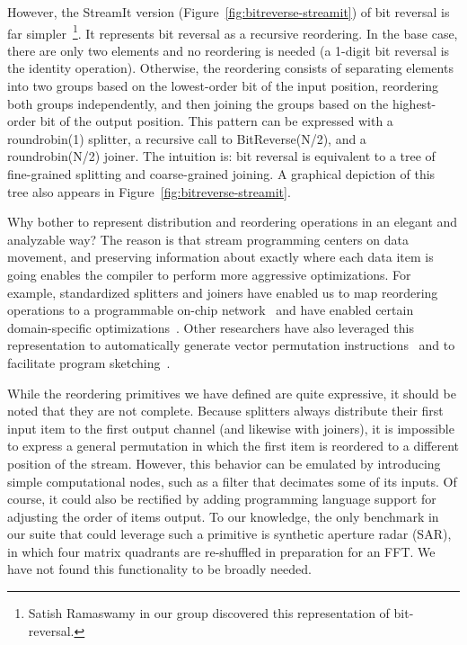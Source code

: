 However, the StreamIt version (Figure~\ref{fig:bitreverse-streamit})
of bit reversal is far simpler~\footnote{Satish Ramaswamy in our group
  discovered this representation of bit-reversal.}.  It represents bit
reversal as a recursive reordering.  In the base case, there are only
two elements and no reordering is needed (a 1-digit bit reversal is
the identity operation).  Otherwise, the reordering consists of
separating elements into two groups based on the lowest-order bit of
the input position, reordering both groups independently, and then
joining the groups based on the highest-order bit of the output
position.  This pattern can be expressed with a roundrobin(1)
splitter, a recursive call to BitReverse(N/2), and a roundrobin(N/2)
joiner.  The intuition is: bit reversal is equivalent to a tree of
fine-grained splitting and coarse-grained joining.  A graphical
depiction of this tree also appears in
Figure~\ref{fig:bitreverse-streamit}.

Why bother to represent distribution and reordering operations in an
elegant and analyzable way?  The reason is that stream programming
centers on data movement, and preserving information about exactly
where each data item is going enables the compiler to perform more
aggressive optimizations.  For example, standardized splitters and
joiners have enabled us to map reordering operations to a programmable
on-chip network~\cite{gordon-asplos02} and have enabled certain
domain-specific
optimizations~\cite{lamb-pldi03,agrawal-cases05,techreport}.
Other researchers have also leveraged this representation to
automatically generate vector permutation
instructions~\cite{mani-permutations} and to facilitate program
sketching~\cite{bit-streaming}.

While the reordering primitives we have defined are quite expressive,
it should be noted that they are not complete.  Because splitters
always distribute their first input item to the first output channel
(and likewise with joiners), it is impossible to express a general
permutation in which the first item is reordered to a different
position of the stream.  However, this behavior can be emulated by
introducing simple computational nodes, such as a filter that
decimates some of its inputs.  Of course, it could also be rectified
by adding programming language support for adjusting the order of
items output.  To our knowledge, the only benchmark in our suite that
could leverage such a primitive is synthetic aperture radar (SAR), in
which four matrix quadrants are re-shuffled in preparation for an FFT.
We have not found this functionality to be broadly needed.

